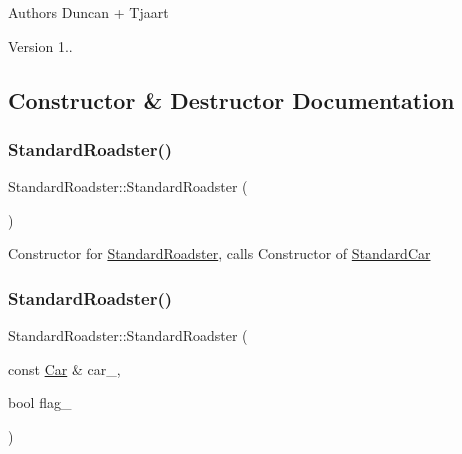 \begin{DoxyAuthor}{Authors}
Duncan + Tjaart 
\end{DoxyAuthor}
\begin{DoxyVersion}{Version}
1.. 
\end{DoxyVersion}


\subsection{Constructor \& Destructor Documentation}
\mbox{\label{class_standard_roadster_a736b370a7bb115760982e89848c0882f}} 
\subsubsection{\texorpdfstring{Standard\+Roadster()}{StandardRoadster()}\hspace{0.1cm}{\footnotesize\ttfamily [1/2]}}
{\footnotesize\ttfamily Standard\+Roadster\+::\+Standard\+Roadster (\begin{DoxyParamCaption}{ }\end{DoxyParamCaption})\hspace{0.3cm}{\ttfamily [inline]}}

Constructor for \mbox{\hyperlink{class_standard_roadster}{Standard\+Roadster}}, calls Constructor of \mbox{\hyperlink{class_standard_car}{Standard\+Car}} \mbox{\label{class_standard_roadster_a9b39f68839c6a89454d71d9fcd45549c}} 
\subsubsection{\texorpdfstring{Standard\+Roadster()}{StandardRoadster()}\hspace{0.1cm}{\footnotesize\ttfamily [2/2]}}
{\footnotesize\ttfamily Standard\+Roadster\+::\+Standard\+Roadster (\begin{DoxyParamCaption}\item[{const \mbox{\hyperlink{class_car}{Car}} \&}]{car\+\_\+,  }\item[{bool}]{flag\+\_\+ }\end{DoxyParamCaption})\hspace{0.3cm}{\ttfamily [inline]}}

